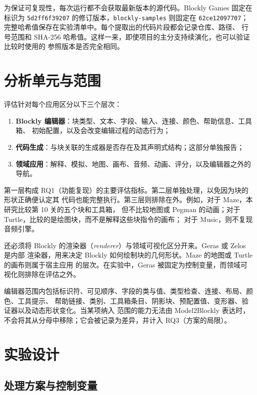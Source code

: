 为保证可复现性，每次运行都不会获取最新版本的源代码。Blockly Games 固定在标识为
\texttt{5d2ff6f39207} 的修订版本，\texttt{blockly-samples} 则固定在
\texttt{62ce12097707}；完整哈希值保存在实验清单中。每个提取出的代码片段都会记录仓库、路径、
行号范围和 SHA-256 哈希值。这样一来，即使项目的主分支持续演化，也可以验证比较时使用的
参照版本是否完全相同。

\section{分析单元与范围}
\label{sec:alcance-evaluacion-externa}

评估针对每个应用区分以下三个层次：

\begin{enumerate}
  \item \textbf{Blockly 编辑器}：块类型、文本、字段、输入、连接、颜色、帮助信息、工具箱、
  初始配置，以及会改变编辑过程的动态行为；
  \item \textbf{代码生成}：与块关联的生成器是否存在及其声明式结构；这部分单独报告；
  \item \textbf{领域应用}：解释、模拟、地图、画布、音频、动画、评分，以及编辑器之外的导航。
\end{enumerate}

第一层构成 RQ1（功能复现）的主要评估指标。第二层单独处理，以免因为块的形状正确便认定其
代码也能完整执行。第三层则排除在外。例如，对于 Maze，本研究比较第 10 关的五个块和工具箱，
但不比较地图或 Pegman 的动画；对于 Turtle，比较的是绘图块，而不是解释这些块指令的画布；
对于 Music，则不复现音频引擎。

还必须将 Blockly 的渲染器（\emph{renderer}）与领域可视化区分开来。Geras 或 Zelos 是内部
渲染器，用来决定 Blockly 如何绘制块的几何形状。Maze 的地图或 Turtle 的画布则属于宿主应用
的层次。在实验中，Geras 被固定为控制变量，而领域可视化则排除在评估之外。

编辑器范围内包括标识符、可见顺序、字段的类与值、类型检查、连接、布局、颜色、工具提示、
帮助链接、类别、工具箱条目、阴影块、预配置值、变形器、验证器以及动态形状变化。当某项纳入
范围的能力无法由 Model2Blockly 表达时，不会将其从分母中移除；它会被记录为差异，并计入
RQ3（方案的局限）。

\section{实验设计}
\label{sec:diseno-experimental-blockly}

\subsection{处理方案与控制变量}

